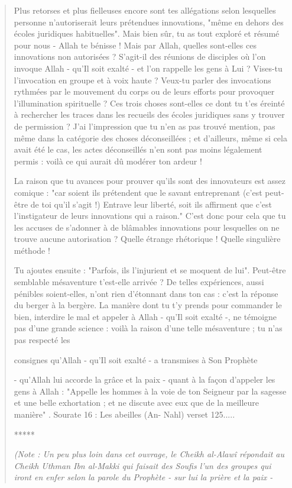 \begin{quote}
Plus retorses et plus fielleuses encore sont tes allégations selon
lesquelles personne n'autoriserait leurs prétendues innovations, "même
en dehors des écoles juridiques habituelles". Mais bien sûr, tu as tout
exploré et résumé pour nous - Allah te bénisse ! Mais par Allah, quelles
sont-elles ces innovations non autorisées ? S'agit-il des réunions de
disciples où l'on invoque Allah - qu'Il soit exalté - et l'on rappelle
les gens à Lui ? Vises-tu l'invocation en groupe et à voix haute ?
Veux-tu parler des invocations rythmées par le mouvement du corps ou de
leurs efforts pour provoquer l'illumination spirituelle ? Ces trois
choses sont-elles ce dont tu t'es éreinté à rechercher les traces dans
les recueils des écoles juridiques sans y trouver de permission ? J'ai
l'impression que tu n'en as pas trouvé mention, pas même dans la
catégorie des choses déconseillées ; et d'ailleurs, même si cela avait
été le cas, les actes déconseillés n'en sont pas moins légalement permis
: voilà ce qui aurait dû modérer ton ardeur !

La raison que tu avances pour prouver qu'ils sont des innovateurs est
assez comique : "car soient ils prétendent que le savant entreprenant
(c'est peut-être de toi qu'il s'agit !) Entrave leur liberté, soit ils
affirment que c'est l'instigateur de leurs innovations qui a raison."
C'est donc pour cela que tu les accuses de s'adonner à de blâmables
innovations pour lesquelles on ne trouve aucune autorisation ? Quelle
étrange rhétorique ! Quelle singulière méthode !

Tu ajoutes ensuite : "Parfois, ils l'injurient et se moquent de lui".
Peut-être semblable mésaventure t'est-elle arrivée ? De telles
expériences, aussi pénibles soient-elles, n'ont rien d'étonnant dans ton
cas : c'est la réponse du berger à la bergère. La manière dont tu t'y
prends pour commander le bien, interdire le mal et appeler à Allah -
qu'Il soit exalté -, ne témoigne pas d'une grande science : voilà la
raison d'une telle mésaventure ; tu n'as pas respecté les

consignes qu'Allah - qu'Il soit exalté - a transmises à Son Prophète

- qu'Allah lui accorde la grâce et la paix - quant à la façon d'appeler
les gens à Allah : "Appelle les hommes à la voie de ton Seigneur par la
sagesse et une belle exhortation ; et ne discute avec eux que de la
meilleure manière" . Sourate 16 : Les abeilles (An- Nahl) verset
125.....

*****

\emph{(Note : Un peu plus loin dans cet ouvrage, le Cheikh al-Alawî
répondait au Cheikh Uthman Ibn al-Makki qui faisait des Soufis l'un des
groupes qui iront en enfer selon la parole du Prophète - sur lui la
prière et la paix -}


\end{quote}
